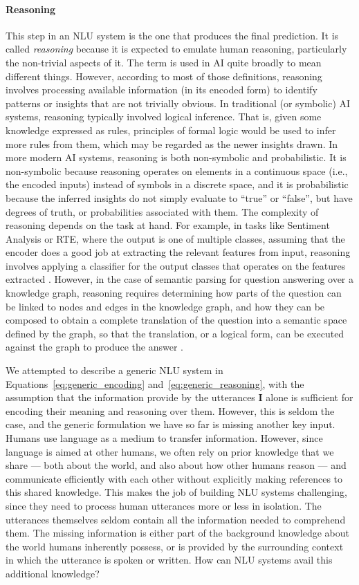\paragraph{Reasoning} This step in an NLU system is the one that produces the final prediction. It is called
\textit{reasoning} because it is expected to emulate human reasoning, particularly the non-trivial aspects of
it.  The term is used in AI quite broadly to mean different things. However, according to most of those
definitions, reasoning involves processing available information (in its encoded form) to identify
patterns or insights that are not trivially obvious. In traditional (or symbolic) AI systems, reasoning
typically involved logical inference. That is, given some knowledge expressed as rules, principles of formal
logic would be used to infer more rules from them, which may be regarded as the newer insights drawn. In more
modern AI systems, reasoning is both non-symbolic and probabilistic. It is non-symbolic because reasoning
operates on elements in a continuous space (i.e., the encoded inputs) instead of symbols in a discrete space,
and it is probabilistic because the inferred insights do not simply evaluate to ``true'' or ``false'', but
have degrees of truth, or probabilities associated with them. The complexity of reasoning depends on the task at hand.
For example, in tasks like Sentiment Analysis
or RTE, where the output is one of multiple classes, assuming that the encoder does a good job at
extracting the relevant features from input, reasoning involves applying a classifier for the output
classes that operates on the features extracted \citep{pang2002thumbs}. However, in the case of
semantic parsing for question answering over a knowledge graph, reasoning requires determining how
parts of the question can be linked to nodes and edges in the knowledge graph, and how they can be
composed to obtain a complete translation of the question into a semantic space defined by the
graph, so that the translation, or a logical form, can be executed against the graph to produce the
answer \citep{Zettlemoyer2005LearningTM}.

We attempted to describe a generic NLU
system in Equations~\ref{eq:generic_encoding} and~\ref{eq:generic_reasoning}, with the assumption
that the information provide by the utterances $\textbf{I}$ alone is sufficient for encoding their
meaning and reasoning over them. However, this is seldom the case, and the generic formulation we
have so far is missing another key input.  Humans use language as a medium to transfer information.
However, since language is aimed at other humans, we often rely on prior knowledge that we share ---
both about the world, and also about how other humans reason --- and communicate efficiently with
each other without explicitly making references to this shared knowledge. This makes the job of
building NLU systems challenging, since they need to process human utterances more or less in
isolation. The utterances themselves seldom contain all the information needed to comprehend them.
The missing information is either part of the background knowledge about the world humans inherently
possess, or is provided by the surrounding context in which the utterance is spoken or written.
How can NLU systems avail this additional knowledge?

